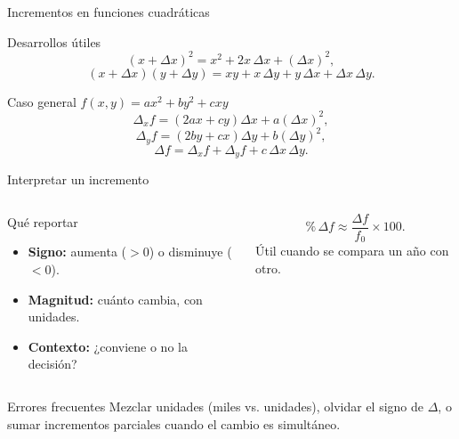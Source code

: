 \documentclass[aspectratio=169]{beamer}
\begin{document}
\begin{frame}{Incrementos en funciones cuadráticas}
  \begin{block}{Desarrollos útiles}
    \[
      (x+\Delta x)^{2}=x^{2}+2x\,\Delta x+(\Delta x)^{2},
    \]
    \[
      (x+\Delta x)(y+\Delta y)
      =xy+x\,\Delta y+y\,\Delta x+\Delta x\,\Delta y.
    \]
  \end{block}
  \begin{exampleblock}{Caso general \(f(x,y)=ax^{2}+by^{2}+cxy\)}
    \[
      \Delta_x f=(2ax+cy)\Delta x+a(\Delta x)^{2},
    \]
    \[
      \Delta_y f=(2by+cx)\Delta y+b(\Delta y)^{2},
    \]
    \[
      \Delta f=\Delta_x f+\Delta_y f+c\,\Delta x\,\Delta y.
    \]
  \end{exampleblock}
\end{frame}

\begin{frame}{Interpretar un incremento}
  \begin{columns}[T]
    \begin{block}{Qué reportar}
      \begin{itemize}
        \item \textbf{Signo:} aumenta (\(>0\)) o disminuye (\(<0\)).
        \item \textbf{Magnitud:} cuánto cambia, con unidades.
        \item \textbf{Contexto:} ¿conviene o no la decisión?
      \end{itemize}
    \end{block}
    \begin{mwextra}
      \[
        \%\,\Delta f\approx \frac{\Delta f}{f_0}\times 100.
      \]
      Útil cuando se compara un año con otro.
    \end{mwextra}
  \end{columns}
  \vspace{2pt}
  \begin{alertblock}{Errores frecuentes}
    Mezclar unidades (miles vs. unidades), olvidar el signo de \(\Delta\), o
    sumar incrementos parciales cuando el cambio es simultáneo.
  \end{alertblock}
\end{frame}
\end{document}
